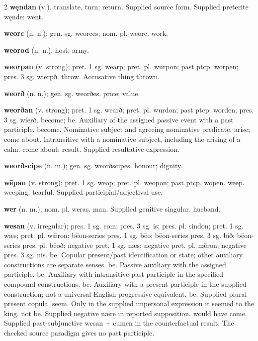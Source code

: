 \begin{multicols*}{2}
\textbf{węndan} (v.). translate. turn; return. Supplied source form. Supplied preterite węnde: went.\par
\textbf{weorc} (n. n.); gen. sg. weorces; nom. pl. weorc. work.\par
\textbf{weorod} (n. n.). host; army.\par
\textbf{weorpan} (v. strong); pret. 1 sg. wearp; pret. pl. wurpon; past ptcp. worpen; pres. 3 sg. wierpð. throw. Accusative thing thrown.\par
\textbf{weorð} (n. n.); gen. sg. weorðes. price; value.\par
\textbf{weorðan} (v. strong); pret. 1 sg. wearð; pret. pl. wurdon; past ptcp. worden; pres. 3 sg. wierð. become; be. Auxiliary of the assigned passive event with a past participle. become. Nominative subject and agreeing nominative predicate. arise; come about. Intransitive with a nominative subject, including the arising of a calm. come about; result. Supplied resultative expression.\par
\textbf{weorðscipe} (n. m.); gen. sg. weorðscipes. honour; dignity.\par
\textbf{wēpan} (v. strong); pret. 1 sg. wēop; pret. pl. wēopon; past ptcp. wōpen. weep. weeping; tearful. Supplied participial/adjectival use.\par
\textbf{wer} (n. m.); nom. pl. weras. man. Supplied genitive singular. husband.\par
\textbf{wesan} (v. irregular); pres. 1 sg. eom; pres. 3 sg. is; pres. pl. sindon; pret. 1 sg. wæs; pret. pl. wǣron; bēon-series pres. 1 sg. bēo; bēon-series pres. 3 sg. bið; bēon-series pres. pl. bēoð; negative pret. 1 sg. næs; negative pret. pl. nǣron; negative pres. 3 sg. nis. be. Copular present/past identification or state; other auxiliary constructions are separate senses. be. Passive auxiliary with the assigned participle. be. Auxiliary with intransitive past participle in the specified compound constructions. be. Auxiliary with a present participle in the supplied construction; not a universal English-progressive equivalent. be. Supplied plural present copula. seem. Only in the supplied impersonal expression it seemed to the king. not be. Supplied negative nǣre in reported supposition. would have come. Supplied past-subjunctive wesan + cumen in the counterfactual result. The checked source paradigm gives no past participle.\par

\end{multicols*}
